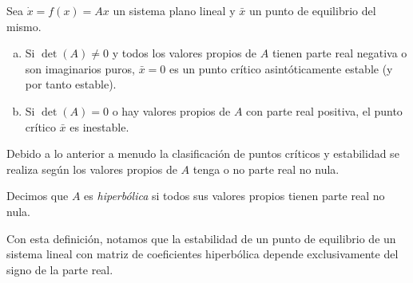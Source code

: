 \begin{theorem} \label{teo:criterioestabilidadlineales}
Sea $\dot{x} = f(x) = Ax$ un sistema plano lineal y $\bar{x}$ un punto de equilibrio del mismo.

\begin{enumerate}[(a)]
	\item Si $\det(A) \neq 0$ y todos los valores propios de $A$ tienen parte real negativa o son imaginarios puros, $\bar{x} = 0$ es un punto crítico asintóticamente estable (y por tanto estable).
	\item Si $\det(A) = 0$ o hay valores propios de $A$ con parte real positiva, el punto crítico $\bar{x}$ es inestable.
\end{enumerate}

Debido a lo anterior a menudo la clasificación de puntos críticos y estabilidad se realiza según los valores propios de $A$ tenga o no parte real no nula.

\begin{definition} Decimos que $A$ es \emph{hiperbólica} si todos sus valores propios tienen parte real no nula.
\end{definition}

Con esta definición, notamos que la estabilidad de un punto de equilibrio de un sistema lineal con matriz de coeficientes hiperbólica depende exclusivamente del signo de la parte real.

\end{theorem}

